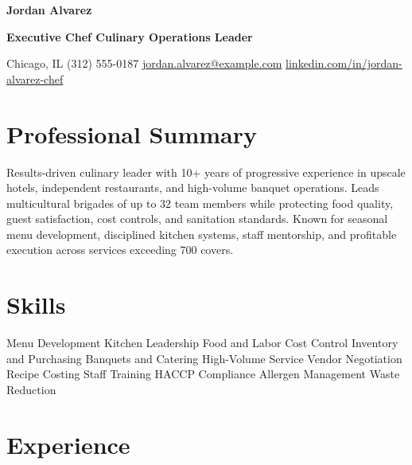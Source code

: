 \documentclass[10pt,letterpaper]{article}
\begin{document}
\begin{center}
  {\fontsize{23}{25}\selectfont\bfseries Jordan Alvarez}\par
  \vspace{0.12em}
  {\large\color{accent}\bfseries Executive Chef \textbar{} Culinary Operations Leader}\par
  \vspace{0.28em}
  Chicago, IL \enspace\textbar\enspace (312) 555-0187
  \enspace\textbar\enspace \href{mailto:jordan.alvarez@example.com}{jordan.alvarez@example.com}
  \enspace\textbar\enspace \href{https://www.linkedin.com/in/jordan-alvarez-chef}{linkedin.com/in/jordan-alvarez-chef}
\end{center}

\section*{Professional Summary}
Results-driven culinary leader with 10+ years of progressive experience in upscale hotels, independent restaurants, and high-volume banquet operations. Leads multicultural brigades of up to 32 team members while protecting food quality, guest satisfaction, cost controls, and sanitation standards. Known for seasonal menu development, disciplined kitchen systems, staff mentorship, and profitable execution across services exceeding 700 covers.

\section*{Skills}
Menu Development \textbar{} Kitchen Leadership \textbar{} Food and Labor Cost Control \textbar{} Inventory and Purchasing \textbar{} Banquets and Catering \textbar{} High-Volume Service \textbar{} Vendor Negotiation \textbar{} Recipe Costing \textbar{} Staff Training \textbar{} HACCP Compliance \textbar{} Allergen Management \textbar{} Waste Reduction

\section*{Experience}
\end{document}
